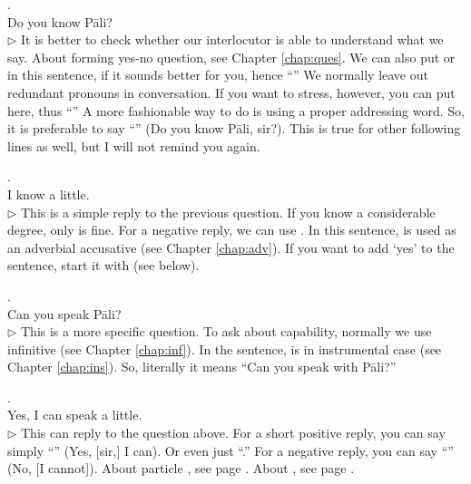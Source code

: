 \medskip
{}. \\
\hspace*{10mm}Do you know P\=ali?\\
{\small $\triangleright$ It is better to check whether our interlocutor is able to understand what we say. About forming yes-no question, see Chapter \ref{chap:ques}. We can also put  or  in this sentence, if it sounds better for you, hence ``'' We normally leave out redundant pronouns in conversation. If you want to stress, however, you can put  here, thus ``'' A more fashionable way to do is using a proper addressing word. So, it is preferable to say ``'' (Do you know P\=ali, sir?). This is true for other following lines as well, but I will not remind you again.}

\medskip
{}. \\
\hspace*{10mm}I know a little.\\
{\small $\triangleright$ This is a simple reply to the previous question. If you know a considerable degree, only  is fine. For a negative reply, we can use . In this sentence,  is used as an adverbial accusative (see Chapter \ref{chap:adv}). If you want to add `yes' to the sentence, start it with  (see below).}

\medskip
{}. \\
\hspace*{10mm}Can you speak P\=ali?\\
{\small $\triangleright$ This is a more specific question. To ask about capability, normally we use infinitive (see Chapter \ref{chap:inf}). In the sentence,  is in instrumental case (see Chapter \ref{chap:ins}). So, literally it means ``Can you speak with P\=ali?''}

\medskip
{}. \\
\hspace*{10mm}Yes, I can speak a little.\\
{\small $\triangleright$ This can reply to the question above. For a short positive reply, you can say simply ``'' (Yes, [sir,] I can). Or even just ``.'' For a negative reply, you can say ``'' (No, [I cannot]). About particle , see page \pageref{nip:aama}. About , see page \pageref{nip:na}.}

